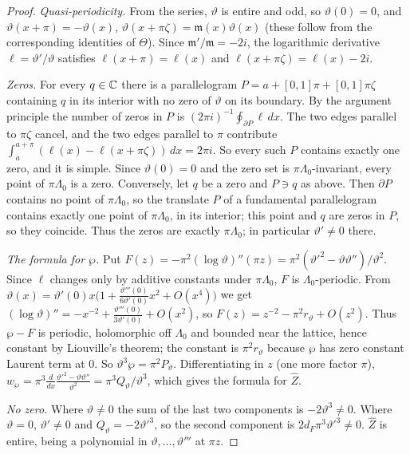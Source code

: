 \begin{proof}
\emph{Quasi-periodicity.} From the series, $\vartheta$ is entire and odd, so $\vartheta(0)=0$, and
$\vartheta(x+\pi)=-\vartheta(x)$, $\vartheta(x+\pi\zeta)=\mathfrak m(x)\vartheta(x)$ (these follow from the corresponding
identities of $\Theta$). Since $\mathfrak m'/\mathfrak m=-2i$, the logarithmic derivative $\ell=\vartheta'/\vartheta$ satisfies
$\ell(x+\pi)=\ell(x)$ and $\ell(x+\pi\zeta)=\ell(x)-2i$.

\emph{Zeros.} For every $q\in\mathbb{C}$ there is a parallelogram $P=a+[0,1]\pi+[0,1]\pi\zeta$ containing $q$ in its interior with no
zero of $\vartheta$ on its boundary. By the argument principle the number of zeros in $P$ is
$(2\pi i)^{-1}\oint_{\partial P}\ell\,dx$. The two edges parallel to $\pi\zeta$ cancel, and the two edges parallel to $\pi$
contribute $\int_a^{a+\pi}(\ell(x)-\ell(x+\pi\zeta))\,dx=2\pi i$. So every such $P$ contains exactly one zero, and it is
simple. Since $\vartheta(0)=0$ and the zero set is $\pi\Lambda_0$-invariant, every point of $\pi\Lambda_0$ is a zero. Conversely, let
$q$ be a zero and $P\ni q$ as above. Then $\partial P$ contains no point of $\pi\Lambda_0$, so the translate $P$ of a fundamental
parallelogram contains exactly one point of $\pi\Lambda_0$, in its interior; this point and $q$ are zeros in $P$, so they coincide.
Thus the zeros are exactly $\pi\Lambda_0$; in particular $\vartheta'\ne0$ there.

\emph{The formula for $\wp$.} Put $F(z)=-\pi^2(\log\vartheta)''(\pi z)=\pi^2(\vartheta'^2-\vartheta\vartheta'')/\vartheta^2$. Since $\ell$
changes only by additive constants under $\pi\Lambda_0$, $F$ is $\Lambda_0$-periodic. From
$\vartheta(x)=\vartheta'(0)x\big(1+\frac{\vartheta'''(0)}{6\vartheta'(0)}x^2+O(x^4)\big)$ we get
$(\log\vartheta)''=-x^{-2}+\frac{\vartheta'''(0)}{3\vartheta'(0)}+O(x^2)$, so $F(z)=z^{-2}-\pi^2r_\vartheta+O(z^2)$. Thus $\wp-F$ is
periodic, holomorphic off $\Lambda_0$ and bounded near the lattice, hence constant by Liouville's theorem; the constant is
$\pi^2r_\vartheta$ because $\wp$ has zero constant Laurent term at $0$. So $\vartheta^3\wp=\pi^2P_\vartheta$. Differentiating in $z$
(one more factor $\pi$),
$w_\wp=\pi^3\frac{d}{dx}\frac{\vartheta'^2-\vartheta\vartheta''}{\vartheta^2}=\pi^3Q_\vartheta/\vartheta^3$, which gives the formula for
$\hat Z$.

\emph{No zero.} Where $\vartheta\ne0$ the sum of the last two components is $-2\vartheta^3\ne0$. Where $\vartheta=0$,
$\vartheta'\ne0$ and $Q_\vartheta=-2\vartheta'^3$, so the second component is $2d_F\pi^3\vartheta'^3\ne0$. $\hat Z$ is entire,
being a polynomial in $\vartheta,\dots,\vartheta'''$ at $\pi z$.


\end{proof}

